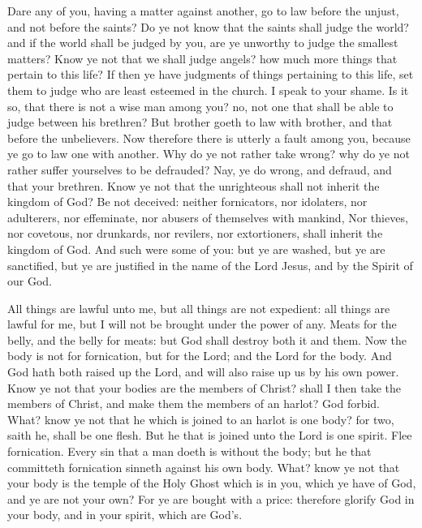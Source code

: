  Dare any of you, having a matter against another, go to
law before the unjust, and not before the saints?  Do ye
not know that the saints shall judge the world? and if the world shall
be judged by you, are ye unworthy to judge the smallest matters?
 Know ye not that we shall judge angels? how much more
things that pertain to this life?  If then ye have
judgments of things pertaining to this life, set them to judge who are
least esteemed in the church.  I speak to your shame. Is
it so, that there is not a wise man among you? no, not one that shall be
able to judge between his brethren?  But brother goeth to
law with brother, and that before the unbelievers.  Now
therefore there is utterly a fault among you, because ye go to law one
with another. Why do ye not rather take wrong? why do ye not rather
suffer yourselves to be defrauded?  Nay, ye do wrong, and
defraud, and that your brethren.  Know ye not that the
unrighteous shall not inherit the kingdom of God? Be not deceived:
neither fornicators, nor idolaters, nor adulterers, nor effeminate, nor
abusers of themselves with mankind,  Nor thieves, nor
covetous, nor drunkards, nor revilers, nor extortioners, shall inherit
the kingdom of God.  And such were some of you: but ye
are washed, but ye are sanctified, but ye are justified in the name of
the Lord Jesus, and by the Spirit of our God.

 All things are lawful unto me, but all things are not
expedient: all things are lawful for me, but I will not be brought under
the power of any.  Meats for the belly, and the belly for
meats: but God shall destroy both it and them. Now the body is not for
fornication, but for the Lord; and the Lord for the body.
 And God hath both raised up the Lord, and will also
raise up us by his own power.  Know ye not that your
bodies are the members of Christ? shall I then take the members of
Christ, and make them the members of an harlot? God forbid.
 What? know ye not that he which is joined to an harlot
is one body? for two, saith he, shall be one flesh.  But
he that is joined unto the Lord is one spirit.  Flee
fornication. Every sin that a man doeth is without the body; but he that
committeth fornication sinneth against his own body. 
What? know ye not that your body is the temple of the Holy Ghost which
is in you, which ye have of God, and ye are not your own?
 For ye are bought with a price: therefore glorify God in
your body, and in your spirit, which are God's.

